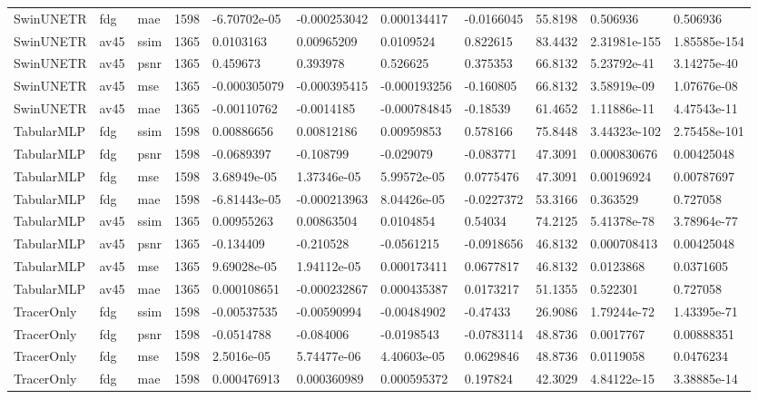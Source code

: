 \begin{landscape}
\begin{longtable}{lllllllllll}
SwinUNETR & fdg & mae & 1598 & -6.70702e-05 & -0.000253042 & 0.000134417 & -0.0166045 & 55.8198 & 0.506936 & 0.506936 \\
SwinUNETR & av45 & ssim & 1365 & 0.0103163 & 0.00965209 & 0.0109524 & 0.822615 & 83.4432 & 2.31981e-155 & 1.85585e-154 \\
SwinUNETR & av45 & psnr & 1365 & 0.459673 & 0.393978 & 0.526625 & 0.375353 & 66.8132 & 5.23792e-41 & 3.14275e-40 \\
SwinUNETR & av45 & mse & 1365 & -0.000305079 & -0.000395415 & -0.000193256 & -0.160805 & 66.8132 & 3.58919e-09 & 1.07676e-08 \\
SwinUNETR & av45 & mae & 1365 & -0.00110762 & -0.0014185 & -0.000784845 & -0.18539 & 61.4652 & 1.11886e-11 & 4.47543e-11 \\
TabularMLP & fdg & ssim & 1598 & 0.00886656 & 0.00812186 & 0.00959853 & 0.578166 & 75.8448 & 3.44323e-102 & 2.75458e-101 \\
TabularMLP & fdg & psnr & 1598 & -0.0689397 & -0.108799 & -0.029079 & -0.083771 & 47.3091 & 0.000830676 & 0.00425048 \\
TabularMLP & fdg & mse & 1598 & 3.68949e-05 & 1.37346e-05 & 5.99572e-05 & 0.0775476 & 47.3091 & 0.00196924 & 0.00787697 \\
TabularMLP & fdg & mae & 1598 & -6.81443e-05 & -0.000213963 & 8.04426e-05 & -0.0227372 & 53.3166 & 0.363529 & 0.727058 \\
TabularMLP & av45 & ssim & 1365 & 0.00955263 & 0.00863504 & 0.0104854 & 0.54034 & 74.2125 & 5.41378e-78 & 3.78964e-77 \\
TabularMLP & av45 & psnr & 1365 & -0.134409 & -0.210528 & -0.0561215 & -0.0918656 & 46.8132 & 0.000708413 & 0.00425048 \\
TabularMLP & av45 & mse & 1365 & 9.69028e-05 & 1.94112e-05 & 0.000173411 & 0.0677817 & 46.8132 & 0.0123868 & 0.0371605 \\
TabularMLP & av45 & mae & 1365 & 0.000108651 & -0.000232867 & 0.000435387 & 0.0173217 & 51.1355 & 0.522301 & 0.727058 \\
TracerOnly & fdg & ssim & 1598 & -0.00537535 & -0.00590994 & -0.00484902 & -0.47433 & 26.9086 & 1.79244e-72 & 1.43395e-71 \\
TracerOnly & fdg & psnr & 1598 & -0.0514788 & -0.084006 & -0.0198543 & -0.0783114 & 48.8736 & 0.0017767 & 0.00888351 \\
TracerOnly & fdg & mse & 1598 & 2.5016e-05 & 5.74477e-06 & 4.40603e-05 & 0.0629846 & 48.8736 & 0.0119058 & 0.0476234 \\
TracerOnly & fdg & mae & 1598 & 0.000476913 & 0.000360989 & 0.000595372 & 0.197824 & 42.3029 & 4.84122e-15 & 3.38885e-14 \\

\end{longtable}
\end{landscape}
